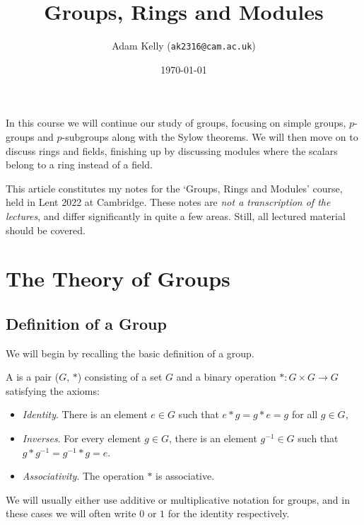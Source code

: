 \documentclass[a4paper]{scrartcl}
\title{Groups, Rings and Modules}
\author{Adam Kelly (\texttt{ak2316@cam.ac.uk})}
\date{\today}
\begin{document}
\maketitle


In this course we will continue our study of groups, focusing on simple groups, $p$-groups and $p$-subgroups along with the Sylow theorems. We will then move on to discuss rings and fields, finishing up by discussing modules where the scalars belong to a ring instead of a field. 

This article constitutes my notes for the `Groups, Rings and Modules' course, held in Lent 2022 at Cambridge. These notes are \emph{not a transcription of the lectures}, and differ significantly in quite a few areas. Still, all lectured material should be covered.



\tableofcontents

\section{The Theory of Groups}

\subsection{Definition of a Group}

We will begin by recalling the basic definition of a group.


\begin{definition}[Group]
	A  is a pair ($G$, $*$) consisting of a set $G$ and a binary operation $* : G \times G \rightarrow G$ satisfying the axioms:
	\begin{itemize}
		\item \emph{Identity}. There is an element $e \in G$ such that $e * g = g * e = g$ for all $g \in G$,
		\item \emph{Inverses}. For every element $g \in G$, there is an element $g^{-1} \in G$ such that $g * g^{-1} = g^{-1} * g = e$.
		\item \emph{Associativity}. The operation $*$ is associative.
	\end{itemize}
\end{definition}


\begin{remark}
	We will usually either use additive or multiplicative notation for groups, and in these cases we will often write $0$ or $1$ for the identity respectively.
\end{remark}
\end{document}
